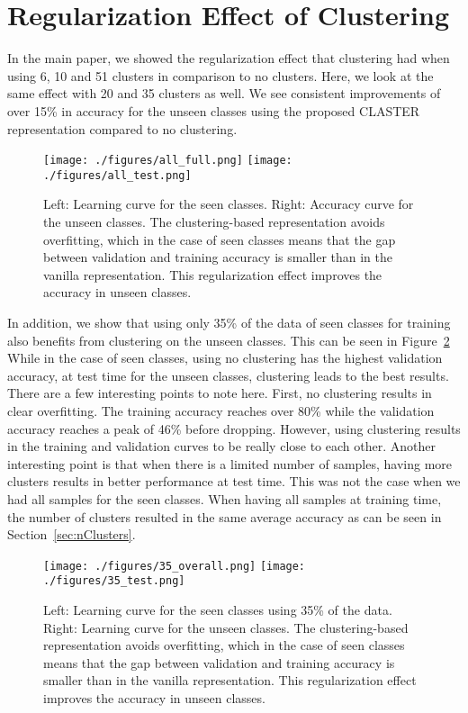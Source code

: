 \documentclass[runningheads]{llncs}
\begin{document}
\section{Regularization Effect of Clustering}
\label{sec:graphs}
In the main paper, we showed the regularization effect that clustering had when using 6, 10 and 51 clusters in comparison to no clusters. Here, we look at the same effect with 20 and 35 clusters as well. We see consistent improvements of over 15\% in accuracy for the unseen classes using the proposed CLASTER representation compared to no clustering.
\begin{figure}
    \centering
    \texttt{[image: ./figures/all\_full.png]}
    \texttt{[image: ./figures/all\_test.png]}
    \caption{Left: Learning curve for the seen classes. Right: Accuracy curve for the unseen classes. The clustering-based representation avoids overfitting, which in the case of seen classes means that the gap between validation and training accuracy is smaller than in the vanilla representation. This regularization effect improves the accuracy in unseen classes. }
    \label{fig:seen_vs_unseen}
\end{figure}

In addition, we show that using only 35\% of the data of seen classes for training also benefits from clustering on the unseen classes. This can be seen in Figure~\ref{fig:seen_vs_unseen_35} While in the case of seen classes, using no clustering has the highest validation accuracy, at test time for the unseen classes, clustering leads to the best results. There are a few interesting points to note here. First, no clustering results in clear overfitting. The training accuracy reaches over 80\% while the validation accuracy reaches a peak of 46\% before dropping. However, using clustering results in the training and validation curves to be really close to each other. Another interesting point is that when there is a limited number of samples, having more clusters results in better performance at test time. This was not the case when we had all samples for the seen classes. When having all samples at training time, the number of clusters resulted in the same average accuracy as can be seen in Section~\ref{sec:nClusters}.

\begin{figure}
    \centering
    \texttt{[image: ./figures/35\_overall.png]}
    \texttt{[image: ./figures/35\_test.png]}
    \caption{Left: Learning curve for the seen classes using 35\% of the data. Right: Learning curve for the unseen classes. The clustering-based representation avoids overfitting, which in the case of seen classes means that the gap between validation and training accuracy is smaller than in the vanilla representation. This regularization effect improves the accuracy in unseen classes. }
    \label{fig:seen_vs_unseen_35}
\end{figure}
\end{document}
